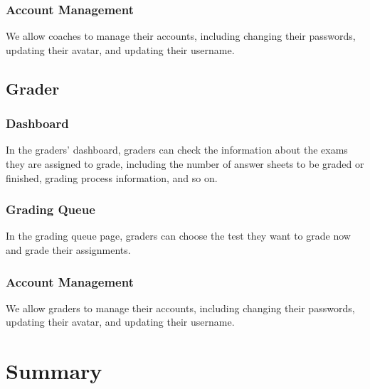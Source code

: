 \documentclass[12pt]{article}
\begin{document}
\subsubsection{Account Management}
We allow coaches to manage their accounts, including changing their passwords, updating their avatar, and updating their username.
\subsection{Grader}
\subsubsection{Dashboard}
In the graders' dashboard, graders can check the information about the exams they are assigned to grade, including the number of answer sheets to be graded or finished,
grading process information, and so on.
\subsubsection{Grading Queue}
In the grading queue page, graders can choose the test they want to grade now and grade their assignments.
\subsubsection{Account Management}
We allow graders to manage their accounts, including changing their passwords, updating their avatar, and updating their username.

\section{Summary}
\end{document}
